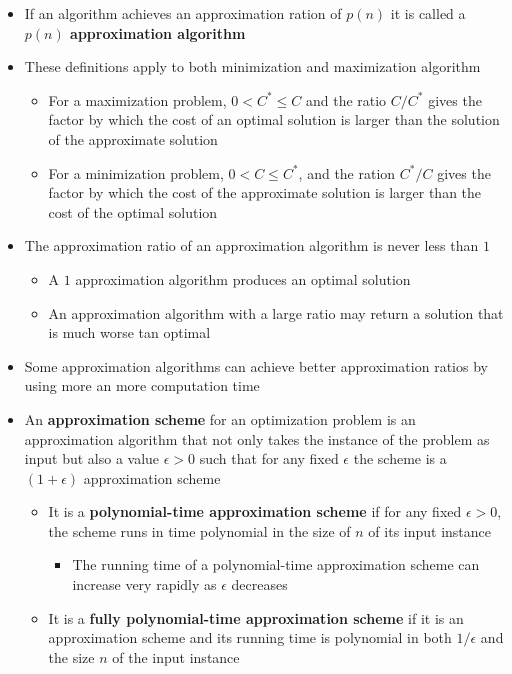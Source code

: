 \documentclass[11pt]{article}
\begin{document}
\begin{itemize}
\item If an algorithm achieves an approximation ration of \(p(n)\) it is called a \textbf{\(p(n)\) approximation algorithm}
\item These definitions apply to both minimization and maximization algorithm
\begin{itemize}
\item For a maximization problem, \(0<C^* \leq C\) and the ratio \(C/C^*\) gives the factor by which the cost of an optimal solution is larger than the solution of the approximate solution
\item For a minimization problem, \(0<C\leq C^*\), and the ration \(C^*/C\) gives the factor by which the cost of the approximate solution is larger than the cost of the optimal solution
\end{itemize}

\item The approximation ratio of an approximation algorithm is never less than \(1\)
\begin{itemize}
\item A \(1\) approximation algorithm produces an optimal solution
\item An approximation algorithm with a large ratio may return a solution that is much worse tan optimal
\end{itemize}

\item Some approximation algorithms can achieve better approximation ratios by using more an more computation time

\item An \textbf{approximation scheme} for an optimization problem is an approximation algorithm that not only takes the instance of the problem as input but also a value \(\epsilon >0\) such that for any fixed \(\epsilon\) the scheme is a \((1+\epsilon)\) approximation scheme
\begin{itemize}
\item It is a \textbf{polynomial-time approximation scheme} if for any fixed \(\epsilon > 0\), the scheme runs in time polynomial in the size of \(n\) of its input instance
\begin{itemize}
\item The running time of a polynomial-time approximation scheme can increase very rapidly as \(\epsilon\) decreases
\end{itemize}
\item It is a \textbf{fully polynomial-time approximation scheme} if it is an approximation scheme and its running time is polynomial in both \(1/\epsilon\) and the size \(n\) of the input instance
\end{itemize}
\end{itemize}
\end{document}
